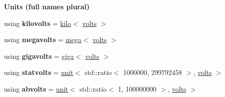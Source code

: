 \begin{Indent}{\bf Units (full names plural)}
\begin{DoxyCompactItemize}
\item 
\hypertarget{namespaceunits_1_1voltage_add58364e47124b51fb8b37faf2a1aed5}{}using {\bfseries kilovolts} = \hyperlink{group___unit_manipulators_ga89965a45aaa6689548b9c53858759c5e}{kilo}$<$ \hyperlink{structunits_1_1unit}{volts} $>$\label{namespaceunits_1_1voltage_add58364e47124b51fb8b37faf2a1aed5}

\item 
\hypertarget{namespaceunits_1_1voltage_aa76ae005cf91585b905474d94282e5c0}{}using {\bfseries megavolts} = \hyperlink{group___unit_manipulators_gab1e685fcf4dd9478ed3d688f7af50842}{mega}$<$ \hyperlink{structunits_1_1unit}{volts} $>$\label{namespaceunits_1_1voltage_aa76ae005cf91585b905474d94282e5c0}

\item 
\hypertarget{namespaceunits_1_1voltage_ab97e252b31cbe61001aca44fde06dfa7}{}using {\bfseries gigavolts} = \hyperlink{group___unit_manipulators_ga4595911f659ef61133216da15d61eb07}{giga}$<$ \hyperlink{structunits_1_1unit}{volts} $>$\label{namespaceunits_1_1voltage_ab97e252b31cbe61001aca44fde06dfa7}

\item 
\hypertarget{namespaceunits_1_1voltage_ae20444e9afe32d1002841b43ff5e8277}{}using {\bfseries statvolts} = \hyperlink{structunits_1_1unit}{unit}$<$ std\+::ratio$<$ 1000000, 299792458 $>$, \hyperlink{structunits_1_1unit}{volts} $>$\label{namespaceunits_1_1voltage_ae20444e9afe32d1002841b43ff5e8277}

\item 
\hypertarget{namespaceunits_1_1voltage_adc81d400cc737523e57e058beb515b49}{}using {\bfseries abvolts} = \hyperlink{structunits_1_1unit}{unit}$<$ std\+::ratio$<$ 1, 100000000 $>$, \hyperlink{structunits_1_1unit}{volts} $>$\label{namespaceunits_1_1voltage_adc81d400cc737523e57e058beb515b49}

\end{DoxyCompactItemize}
\end{Indent}
